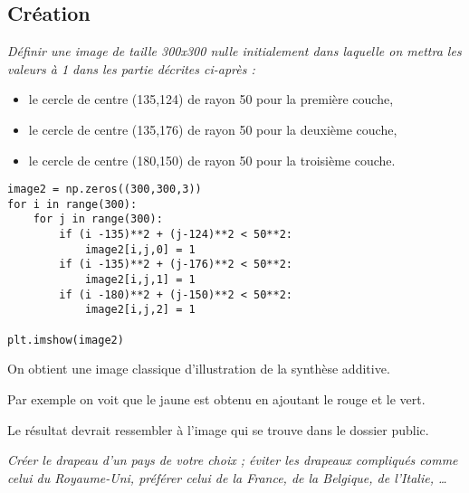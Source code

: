 \subsection{Création}
\begin{Exercise}\it Définir une image de taille 300x300 nulle initialement dans laquelle on mettra les valeurs à 1 dans les partie décrites ci-après :
\begin{itemize}
\item le cercle de centre (135,124) de rayon 50 pour la première couche,
\item le cercle de centre (135,176) de rayon 50 pour la deuxième couche,
\item le cercle de centre (180,150) de rayon 50 pour la troisième couche.
\end{itemize}

\end{Exercise}
\begin{Answer}
\begin{lstlisting}
image2 = np.zeros((300,300,3))
for i in range(300):
    for j in range(300):
        if (i -135)**2 + (j-124)**2 < 50**2:
            image2[i,j,0] = 1
        if (i -135)**2 + (j-176)**2 < 50**2:
            image2[i,j,1] = 1
        if (i -180)**2 + (j-150)**2 < 50**2:
            image2[i,j,2] = 1

plt.imshow(image2)
\end{lstlisting}
\end{Answer}

On obtient une image classique d'illustration de la synthèse additive. 

Par exemple on voit que le jaune est obtenu en ajoutant le rouge et le vert.

Le résultat devrait ressembler à l'image  qui se trouve dans le dossier public.

\begin{Exercise}\it Créer le drapeau d'un pays de votre choix ; éviter les drapeaux compliqués comme celui du Royaume-Uni, préférer celui de la France, de la Belgique, de l'Italie, \dots
\end{Exercise}
\begin{Answer}
\begin{lstlisting}
\end{lstlisting}
\end{Answer}
